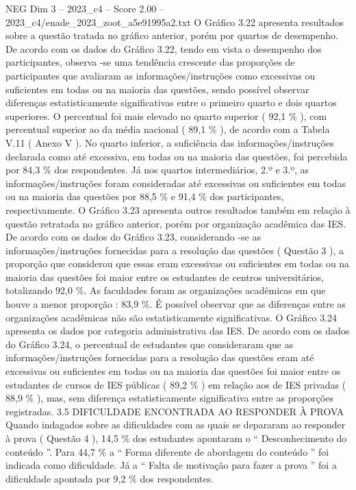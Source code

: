 \begin{textsample}{NEG Dim 3 – 2023\_c4 – Score 2.00 – 2023\_c4/enade\_2023\_zoot\_a5e91995a2.txt}
O Gráfico 3.22 apresenta resultados sobre a questão tratada no gráfico anterior, porém por quartos de desempenho.
De acordo com os dados do Gráfico 3.22, tendo em vista o desempenho dos participantes, observa -se uma tendência crescente das proporções de participantes que avaliaram as informações/instruções como excessivas ou suficientes em todas ou na maioria das questões, sendo possível observar diferenças estatisticamente significativas entre o primeiro quarto e dois quartos superiores.
O percentual foi mais elevado no quarto superior ( 92,1 \% ), com percentual superior ao da média nacional ( 89,1 \% ), de acordo com a Tabela V.11 ( Anexo V ).
No quarto inferior, a suficiência das informações/instruções declarada como até excessiva, em todas ou na maioria das questões, foi percebida por 84,3 \% dos respondentes.
Já nos quartos intermediários, 2.º e 3.º, as informações/instruções foram consideradas até excessivas ou suficientes em todas ou na maioria das questões por 88,5 \% e 91,4 \% dos participantes, respectivamente.
O Gráfico 3.23 apresenta outros resultados também em relação à questão retratada no gráfico anterior, porém por organização acadêmica das IES.
De acordo com os dados do Gráfico 3.23, considerando -se as informações/instruções fornecidas para a resolução das questões ( Questão 3 ), a proporção que considerou que essas eram excessivas ou suficientes em todas ou na maioria das questões foi maior entre os estudantes de centros universitários, totalizando 92,0 \%.
As faculdades foram as organizações acadêmicas em que houve a menor proporção : 83,9 \%.
É possível observar que as diferenças entre as organizações acadêmicas não são estatisticamente significativas.
O Gráfico 3.24 apresenta os dados por categoria administrativa das IES.
De acordo com os dados do Gráfico 3.24, o percentual de estudantes que consideraram que as informações/instruções fornecidas para a resolução das questões eram até excessivas ou suficientes em todas ou na maioria das questões foi maior entre os estudantes de cursos de IES públicas ( 89,2 \% ) em relação aos de IES privadas ( 88,9 \% ), mas, sem diferença estatisticamente significativa entre as proporções registradas. 3.5 DIFICULDADE ENCONTRADA AO RESPONDER À PROVA Quando indagados sobre as dificuldades com as quais se depararam ao responder à prova ( Questão 4 ), 14,5 \% dos estudantes apontaram o “ Desconhecimento do conteúdo ”.
Para 44,7 \% a “ Forma diferente de abordagem do conteúdo ” foi indicada como dificuldade.
Já a “ Falta de motivação para fazer a prova ” foi a dificuldade apontada por 9,2 \% dos respondentes.

\end{textsample}
